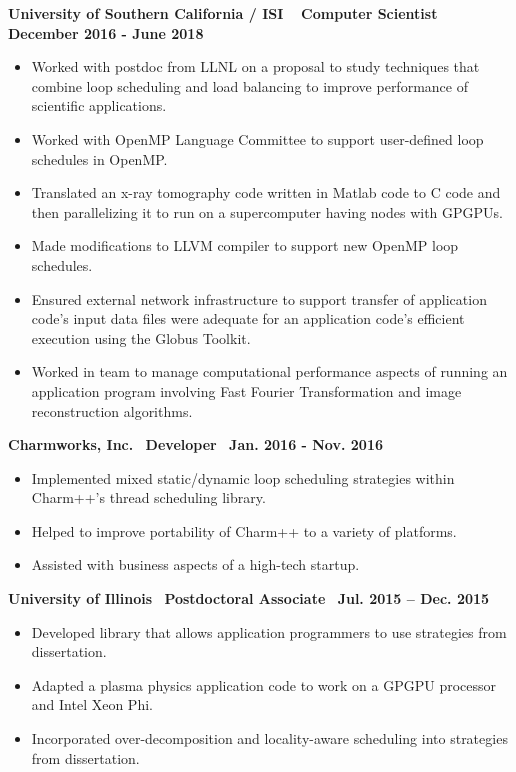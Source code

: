 \textbf{University of Southern California / ISI $\>$$\>$$\>$$\>$Computer Scientist$\>$$\>$$\>$$\>$December 2016 - June 2018}
\vspace*{-0.0in} 
\begin{itemize}
\item Worked with postdoc from LLNL on a proposal to study
techniques that combine loop scheduling and load balancing to improve
performance of scientific applications.
\item Worked with OpenMP Language Committee to support user-defined loop schedules in OpenMP.
\item Translated an x-ray tomography code written in
Matlab code to C code and then parallelizing it to run on a supercomputer
having nodes with GPGPUs. 
\item Made modifications to LLVM compiler to support new OpenMP loop schedules. 
\item Ensured external network infrastructure to support transfer of application code's input data files were adequate
for an application code's efficient execution using the Globus Toolkit. 
\item Worked in team to manage computational performance aspects of running an application program involving Fast Fourier Transformation and image reconstruction algorithms. 
\end{itemize}

\textbf{Charmworks, Inc.$\>$$\>$$\>$$\>$Developer$\>$$\>$$\>$$\>$Jan. 2016 - Nov. 2016}
\vspace*{-0.0in}
\begin{itemize}
\item Implemented mixed static/dynamic loop scheduling
strategies within Charm++'s thread scheduling library.
\item Helped to improve portability of Charm++ to a variety of platforms. 
\item Assisted with business aspects of a high-tech startup. 
\end{itemize} 

\textbf{ University of Illinois$\>$$\>$$\>$$\>$Postdoctoral Associate$\>$$\>$$\>$$\>$Jul. 2015 – Dec. 2015}
\vspace*{-0.0in}
\begin{itemize} 
\item Developed library that allows application programmers to use strategies from dissertation.
\item Adapted a plasma physics application code to work on a
GPGPU processor and Intel Xeon Phi.
\item Incorporated over-decomposition and locality-aware scheduling into strategies from dissertation.
\end{itemize}

